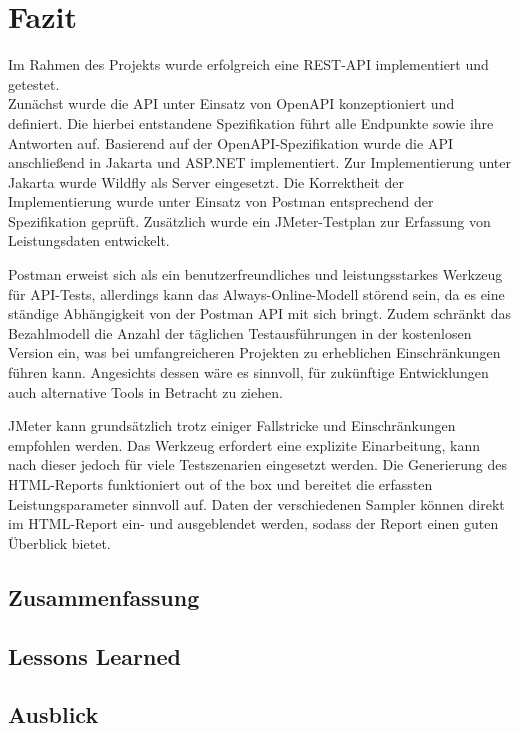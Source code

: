 \chapter{Fazit}

Im Rahmen des Projekts wurde erfolgreich eine REST-API implementiert und getestet.\\


Zunächst wurde die API unter Einsatz von OpenAPI konzeptioniert und definiert.
Die hierbei entstandene Spezifikation führt alle Endpunkte sowie ihre Antworten auf.
Basierend auf der OpenAPI-Spezifikation wurde die API anschließend in Jakarta und ASP.NET implementiert.
Zur Implementierung unter Jakarta wurde Wildfly als Server eingesetzt.
Die Korrektheit der Implementierung wurde unter Einsatz von Postman entsprechend der Spezifikation geprüft.
Zusätzlich wurde ein JMeter-Testplan zur Erfassung von Leistungsdaten entwickelt.



Postman erweist sich als ein benutzerfreundliches und leistungsstarkes Werkzeug für API-Tests,
allerdings kann das Always-Online-Modell störend sein, da es eine ständige Abhängigkeit von der Postman API mit sich bringt.
Zudem schränkt das Bezahlmodell die Anzahl der täglichen Testausführungen in der kostenlosen Version ein,
was bei umfangreicheren Projekten zu erheblichen Einschränkungen führen kann. 
Angesichts dessen wäre es sinnvoll, 
für zukünftige Entwicklungen auch alternative Tools in Betracht zu ziehen. 

JMeter kann grundsätzlich trotz einiger Fallstricke und Einschränkungen empfohlen werden.
Das Werkzeug erfordert eine explizite Einarbeitung,
kann nach dieser jedoch für viele Testszenarien eingesetzt werden.
Die Generierung des HTML-Reports funktioniert out of the box
und bereitet die erfassten Leistungsparameter sinnvoll auf.
Daten der verschiedenen Sampler können direkt im HTML-Report ein- und ausgeblendet werden,
sodass der Report einen guten Überblick bietet.


\section{Zusammenfassung}

\section{Lessons Learned}

\section{Ausblick}

